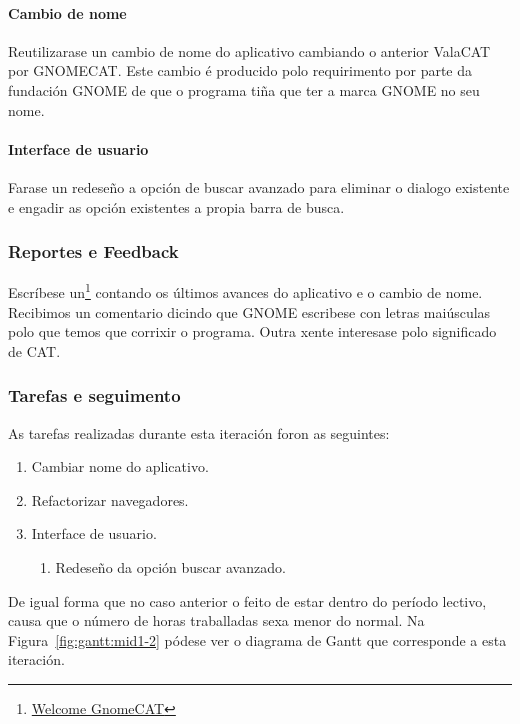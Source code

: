 \paragraph{Cambio de nome} Reutilizarase un cambio de nome do aplicativo cambiando o anterior ValaCAT por GNOMECAT. Este cambio é producido polo requirimento por parte da fundación GNOME de que o programa tiña que ter a marca GNOME no seu nome.

\paragraph{Interface de usuario} Farase un redeseño a opción de buscar avanzado para eliminar o dialogo existente e engadir as opción existentes a propia barra de busca.

\subsubsection{Reportes e Feedback}
Escríbese un\footnote{\href{http://aquelando.info/welcome-gnomecat/}{Welcome GnomeCAT}} contando os últimos avances do aplicativo e o cambio de nome. Recibimos un comentario dicindo que GNOME escribese con letras maiúsculas polo que temos que corrixir o programa. Outra xente interesase polo significado de CAT.

\subsubsection{Tarefas e seguimento}

As tarefas realizadas durante esta iteración foron as seguintes:

\begin{enumerate}[label=\bfseries WBS 2.\arabic*]
  \item Cambiar nome do aplicativo.
  \item Refactorizar navegadores.
  \item Interface de usuario.
    \begin{enumerate}[label=\bfseries WBS 2.3.\arabic*]
      \item Redeseño da opción buscar avanzado.
    \end{enumerate}
\end{enumerate}

De igual forma que no caso anterior o feito de estar dentro do período lectivo, causa que o número de horas traballadas sexa menor do normal. Na Figura~\ref{fig:gantt:mid1-2} pódese ver o diagrama de Gantt que corresponde a esta iteración.

